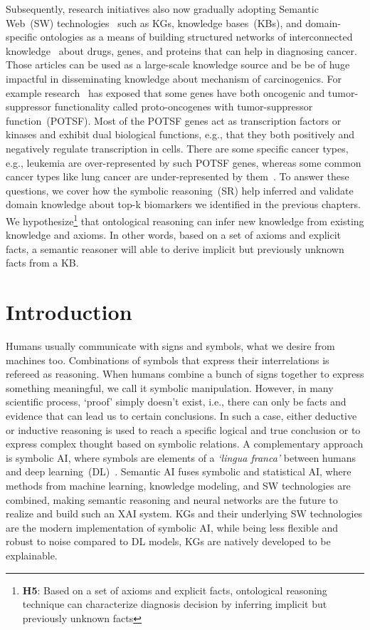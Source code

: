 \hspace*{3.5mm} Subsequently, research initiatives also now gradually adopting Semantic Web~(SW) technologies~\cite{karim2018improving} such as KGs, knowledge bases~(KBs), and domain-specific ontologies as a means of building structured networks of interconnected knowledge~\cite{futia2020integration} about drugs, genes, and proteins that can help in diagnosing cancer. Those articles can be used as a large-scale knowledge source and be be of huge impactful in disseminating knowledge about mechanism of carcinogenics. For example research~\cite{POSTF} has exposed that some genes have both oncogenic and tumor-suppressor functionality called  proto-oncogenes with tumor-suppressor function~(POTSF). Most of the POTSF genes act as transcription factors or kinases and exhibit dual biological functions, e.g., that they both positively and negatively regulate transcription in cells. There are some specific cancer types, e.g., leukemia are over-represented by such POTSF genes, whereas some common cancer types like lung cancer are under-represented by them~\cite{POSTF}. To answer these questions, we cover how the symbolic reasoning~(SR) help inferred and validate domain knowledge about top-k biomarkers we identified in the previous chapters. 
We hypothesize\footnote{\textbf{H5}: Based on a set of axioms and explicit facts, ontological reasoning technique can characterize diagnosis decision by inferring implicit but previously unknown facts} that ontological reasoning can infer new knowledge from existing knowledge and axioms. In other words, based on a set of axioms and explicit facts, a semantic reasoner will able to derive implicit but previously unknown facts from a KB. 

\section{Introduction}
Humans usually communicate with signs and symbols, what we desire from machines too. Combinations of symbols that express their interrelations is refereed as reasoning. When humans combine a bunch of signs together to express something meaningful, we call it symbolic manipulation. However, in many scientific process, `proof' simply doesn't exist, i.e., there can only be facts and evidence that can lead us to certain conclusions. In such a case, either deductive or inductive reasoning is used to reach a specific logical and true conclusion or to express complex thought based on symbolic relations.%
A complementary approach is symbolic AI, where symbols are elements of a \textit{`lingua franca'} between humans and deep learning~(DL)~\cite{janssens2007dynamic}. Semantic AI fuses symbolic and statistical AI, where methods from machine learning, knowledge modeling, and SW technologies are combined, making semantic reasoning and neural networks are the future to realize and build such an XAI system. KGs and their underlying SW technologies are the modern implementation of symbolic AI, while being less flexible and robust to noise compared to DL models, KGs are natively developed to be explainable. 

